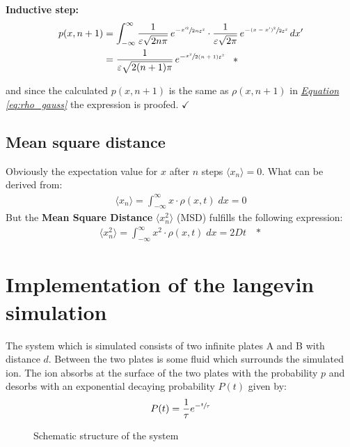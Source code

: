 \documentclass[a4paper, parskip=half]{scrartcl}
\newcommand{\effect}[1]{%
	\textbf{#1}%
}
\newcommand{\myEqRef}[1]{\textit{\hyperref[eq:#1]{Equation \ref*{eq:#1}}}}
\newcommand{\myEqLabel}[1]{\label{eq:#1}}
\newcommand{\myEqAnnex}[1]{\;\;\;\ast \myEqLabel{#1}}
\begin{document}
\textbf{Inductive step:}
\begin{align}
p(x,n+1) &= \int_{-\infty}^\infty \frac{1}{\varepsilon\sqrt{2n\pi}}\, e^{-\sfrac{x'^2}{2n\varepsilon^2}} \cdot \frac{1}{\varepsilon\sqrt{2\pi}}\, e^{-\sfrac{(x - x')^2}{2\varepsilon^2}} \, dx'\\
&= \frac{1}{\varepsilon\sqrt{2(n+1)\pi}}\, e^{-\sfrac{x^2}{2(n+1)\varepsilon^2}} \myEqAnnex{gauss_random_walk}
\end{align}

and since the calculated $p(x,n+1)$ is the same as $\rho(x,n+1)$ in \myEqRef{rho_gauss} the expression is proofed. $\checkmark$
\subsection{Mean square distance}
Obviously the expectation value for $x$ after $n$ steps $\langle x_n\rangle = 0$. What can be derived from:
\begin{align}
\langle x_n\rangle = \int_{-\infty}^\infty x \cdot \rho(x,t)\; dx = 0
\end{align}
But the \effect{Mean Square Distance} $\langle x_n^2\rangle$ (MSD) fulfills the following expression:
\begin{align}
\langle x_n^2\rangle = \int_{-\infty}^\infty x^2 \cdot \rho(x,t)\; dx = 2 D t \myEqAnnex{MSD}
\end{align}

\section{Implementation of the langevin simulation}
The system which is simulated consists of two infinite plates A and B with distance $d$. Between the two plates is some fluid which surrounds the simulated ion. The ion absorbs at the surface of the two plates with the probability $p$ and desorbs with an exponential decaying probability $P(t)$ given by:
\begin{align}
P(t) = \frac{1}{\tau}e^{- \sfrac{t}{\tau}}
\end{align}
\begin{figure}[ht!]
\centering
{}
\caption{Schematic structure of the system}
\end{figure}
\end{document}
